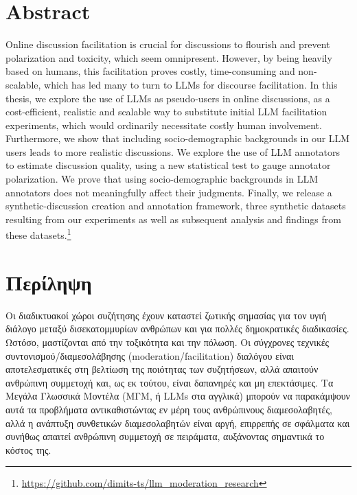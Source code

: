 %

\let\cleardoublepage\clearpage

\chapter*{Abstract}
\label{sec:abstract}

Online discussion facilitation is crucial for discussions to flourish and prevent polarization and toxicity, which seem omnipresent. However, by being heavily based on humans, this facilitation proves costly, time-consuming and non-scalable, which has led many to turn to LLMs for discourse facilitation. In this thesis, we explore the use of LLMs as pseudo-users in online discussions, as a cost-efficient, realistic and scalable way to substitute initial LLM facilitation experiments, which would ordinarily necessitate costly human involvement. Furthermore, we show that including socio-demographic backgrounds in our LLM users leads to more realistic discussions. We explore the use of LLM annotators to estimate discussion quality, using a new statistical test to gauge annotator polarization. We prove that using socio-demographic backgrounds in LLM annotators does not meaningfully affect their judgments. Finally, we release a synthetic-discussion creation and annotation framework, three synthetic datasets resulting from our experiments as well as subsequent analysis and findings from these datasets.\footnote{\url{https://github.com/dimits-ts/llm_moderation_research}}


\chapter*{Περίληψη}
\label{sec:abstract_greek}

Οι διαδικτυακοί χώροι συζήτησης έχουν καταστεί ζωτικής σημασίας για τον υγιή διάλογο μεταξύ δισεκατομμυρίων ανθρώπων και για πολλές δημοκρατικές διαδικασίες. Ωστόσο, μαστίζονται από την τοξικότητα και την πόλωση. Οι σύγχρονες τεχνικές συντονισμού/διαμεσολάβησης (moderation/facilitation) διαλόγου είναι αποτελεσματικές στη βελτίωση της ποιότητας των συζητήσεων, αλλά απαιτούν ανθρώπινη συμμετοχή και, ως εκ τούτου, είναι δαπανηρές και μη επεκτάσιμες. Τα Μεγάλα Γλωσσικά Μοντέλα (ΜΓΜ, ή LLMs στα αγγλικά) μπορούν να παρακάμψουν αυτά τα προβλήματα αντικαθιστώντας εν μέρη τους ανθρώπινους διαμεσολαβητές, αλλά η ανάπτυξη συνθετικών διαμεσολαβητών είναι αργή, επιρρεπής σε σφάλματα και συνήθως απαιτεί ανθρώπινη συμμετοχή σε πειράματα, αυξάνοντας σημαντικά το κόστος της. 

